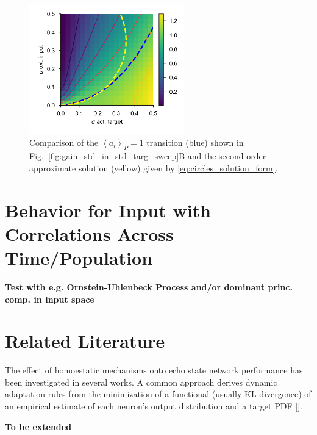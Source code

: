 \documentclass[10pt,a4paper]{article}
\newcommand{\avgp}[1]{\left< #1 \right>_P}
\begin{document}
\begin{figure}
	\centering
	\includegraphics[width=0.6\textwidth]{../plots/crit_transition_2nd_order_approx.png}
	\caption{Comparison of the $\avgp{a_i} = 1$ transition (blue) shown in Fig.~\ref{fig:gain_std_in_std_targ_sweep}B and the second order approximate solution (yellow) given by \eqref{eq:circles_solution_form}. }
	\label{fig:crit_transition_2nd_order_approx}
\end{figure}

\section{Behavior for Input with Correlations Across Time/Population}

{\bf Test with e.g. Ornstein-Uhlenbeck Process and/or dominant princ. comp. in input space}

\section{Related Literature}

The effect of homoestatic mechanisms onto echo state network performance has been investigated in several works. A common approach derives dynamic adaptation rules from the minimization of a functional (usually KL-divergence) of an empirical estimate of each neuron's output distribution and a target PDF [\cite{Triesch_2007, Schrauwen_2008, Boedecker_2009}].

{\bf To be extended}



\end{document}
